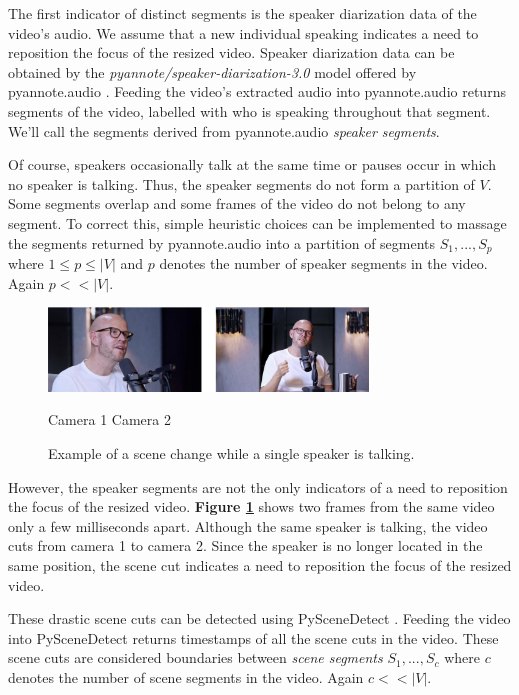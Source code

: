 \documentclass{article}
\begin{document}
The first indicator of distinct segments is the speaker diarization data of the video's audio. We assume that a new individual speaking indicates a need to reposition the focus of the resized video. Speaker diarization data can be obtained by the \emph{pyannote/speaker-diarization-3.0} model offered by pyannote.audio \cite{Plaquet23} \cite{Bredin23}. Feeding the video's extracted audio into pyannote.audio returns segments of the video, labelled with who is speaking throughout that segment. We'll call the segments derived from pyannote.audio \emph{speaker segments}. 

Of course, speakers occasionally talk at the same time or pauses occur in which no speaker is talking. Thus, the speaker segments do not form a partition of $V$. Some segments overlap and some frames of the video do not belong to any segment. To correct this, simple heuristic choices can be implemented to massage the segments returned by pyannote.audio into a partition of segments $S_1, ..., S_p$ where $1 \le p \le |V|$ and $p$ denotes the number of speaker segments in the video. Again $p << |V|$.

\begin{figure}[htb]
\begin{minipage}[b]{1.0\linewidth}
    \centering
    \centerline{\includegraphics[width=8.5cm]{scene-segment.png}}
    \centerline{Camera 1 \; \; \; \; \; \; \; \; \; \; \; \; \; \; \; \; Camera 2}
    \medskip
\end{minipage}
\caption{Example of a scene change while a single speaker is talking.}
\label{fig:scene-segment}
\end{figure}

However, the speaker segments are not the only indicators of a need to reposition the focus of the resized video. \textbf{Figure \ref{fig:scene-segment}} shows two frames from the same video only a few milliseconds apart. Although the same speaker is talking, the video cuts from camera 1 to camera 2. Since the speaker is no longer located in the same position, the scene cut indicates a need to reposition the focus of the resized video.

These drastic scene cuts can be detected using PySceneDetect \cite{PySceneDetect}. Feeding the video into PySceneDetect returns timestamps of all the scene cuts in the video. These scene cuts are considered boundaries between \emph{scene segments} $S_1, ..., S_c$ where $c$ denotes the number of scene segments in the video. Again $c << |V|$.
\end{document}
